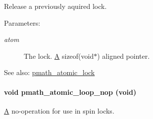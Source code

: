 Release a previously aquired lock. 

\begin{Desc}
\item[Parameters:]
\begin{description}
\item[{\em atom}]The lock. \hyperlink{class_a}{A} sizeof(void$\ast$) aligned pointer.\end{description}
\end{Desc}
\begin{Desc}
\item[See also:]\hyperlink{group__atomic__ops_gf143a22332da6a2065bac14069ecbf7f}{pmath\_\-atomic\_\-lock} \end{Desc}
\hypertarget{group__atomic__ops_gf92920164c2e99abfbbe092dfc5dae86}{
\paragraph[{pmath\_\-atomic\_\-loop\_\-nop}]{\setlength{\rightskip}{0pt plus 5cm}void pmath\_\-atomic\_\-loop\_\-nop (void)}\hfill}
\label{group__atomic__ops_gf92920164c2e99abfbbe092dfc5dae86}


\hyperlink{class_a}{A} no-operation for use in spin locks. 